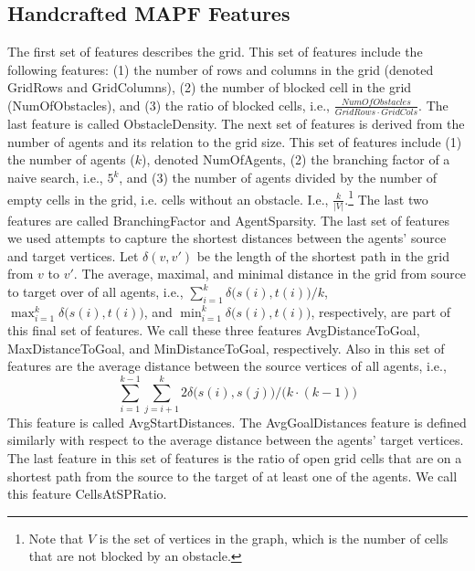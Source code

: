 \documentclass[letterpaper]{article} %
\begin{document}
\subsection{Handcrafted MAPF Features}
\label{sec:xgbsoot}
The first set of features describes the grid. This set of features include the following features:
(1) the number of rows and columns in the grid (denoted GridRows and GridColumns), 
(2) the number of blocked cell in the grid (NumOfObstacles), 
and (3) the ratio of blocked cells, i.e., $\frac{NumOfObstacles}{GridRows\cdot GridCols}$. The last feature is called ObstacleDensity. 
The next set of features is derived from the number of agents and its relation to the grid size. This set of features include 
(1) the number of agents ($k$), denoted NumOfAgents, 
(2) the branching factor of a naive \astar search, i.e., $5^k$, 
and (3) the number of agents divided by the number of empty cells in the grid, i.e. cells without an obstacle. I.e., $\frac{k}{|V|}$.\footnote{Note that $V$ is the set of vertices in the graph, which is the number of cells that are not blocked by an obstacle.} The last two features are called BranchingFactor and AgentSparsity. 
The last set of features we used attempts to capture the shortest distances between the agents' source and target vertices. 
Let $\delta(v,v')$ be the length of the shortest path in the grid from $v$ to $v'$. 
The average, maximal, and minimal distance in the grid from source to target over of all agents, i.e.,
$\sum_{i=1}^k\delta\big(s(i),t(i)\big)/k$, 
$\max_{i=1}^k\delta\big(s(i),t(i)\big)$, and 
$\min_{i=1}^k\delta\big(s(i),t(i)\big)$, respectively, are part of this final set of features. 
We call these three features AvgDistanceToGoal, MaxDistanceToGoal, and MinDistanceToGoal, respectively. 
Also in this set of features are the average distance between the source vertices of all agents, i.e., 
    \begin{equation}
            \sum_{i=1}^{k-1}\sum_{j=i+1}^k 2\delta\big(s(i),s(j)\big)/\big(k\cdot (k-1)\big)
    \end{equation}
This feature is called AvgStartDistances. The AvgGoalDistances feature is defined similarly with respect to the average distance between the agents' target vertices. 
The last feature in this set of features is the ratio of open grid cells that are on a shortest path from the source to the target of at least one of the agents. We call this feature CellsAtSPRatio. 
\end{document}

